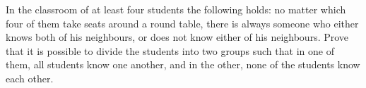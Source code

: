 In the classroom of at least four students the following holds: no matter which four of them take seats around a round table, there is always someone who either knows both of his neighbours, or does not know either of his neighbours. Prove that it is possible to divide the students into two groups such that in one of them, all students know one another, and in the other, none of the students know each other.
